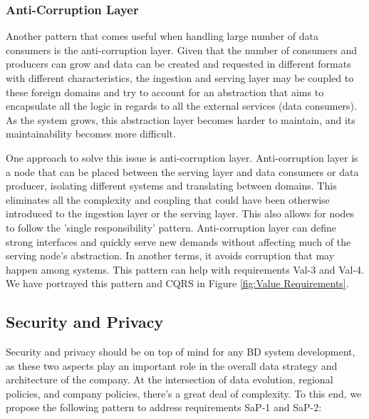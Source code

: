 \documentclass{bmcart}
\begin{document}
\subsubsection{Anti-Corruption Layer}

Another pattern that comes useful when handling large number of data consumers is the anti-corruption layer. Given that the number of consumers and producers can grow and data can be created and requested in different formats with different characteristics, the ingestion and serving layer may be coupled to these foreign domains and try to account for an abstraction that aims to encapsulate all the logic in regards to all the external services (data consumers). As the system grows, this abstraction layer becomes harder to maintain, and its maintainability becomes more difficult. 

One approach to solve this issue is anti-corruption layer. Anti-corruption layer is a node that can be placed between the serving layer and data consumers or data producer, isolating different systems and translating between domains. This eliminates all the complexity and coupling that could have been otherwise introduced to the ingestion layer or the serving layer. This also allows for nodes to follow the 'single responsibility' pattern. Anti-corruption layer can define strong interfaces and quickly serve new demands without affecting much of the serving node's abstraction. In another terms, it avoids corruption that may happen among systems. This pattern can help with requirements Val-3 and Val-4. We have portrayed this pattern and CQRS in Figure \ref{fig:Value Requirements}.


\subsection{Security and Privacy}

Security and privacy should be on top of mind for any BD system development, as these two aspects play an important role in the overall data strategy and architecture of the company. At the intersection of data evolution, regional policies, and company policies, there's a great deal of complexity. To this end, we propose the following pattern to address requirements SaP-1 and SaP-2:
\end{document}

